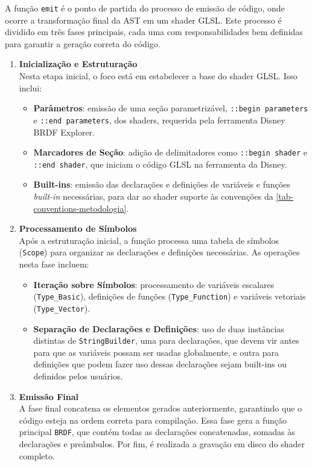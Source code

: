 A função \verb"emit" é o ponto de partida do processo de emissão de código, onde ocorre a transformação final da AST em um shader GLSL. Este processo é dividido em três fases principais, cada uma com responsabilidades bem definidas para garantir a geração correta do código.

\begin{enumerate}
    \item \textbf{Inicialização e Estruturação} \\
    Nesta etapa inicial, o foco está em estabelecer a base do shader GLSL. Isso inclui:
    \begin{itemize}
        \item \textbf{Parâmetros}: emissão de uma seção parametrizável, \verb"::begin parameters" e \verb"::end parameters", dos shaders, requerida pela ferramenta Disney BRDF Explorer.
        \item \textbf{Marcadores de Seção}: adição de delimitadores como \verb|::begin shader| e \verb|::end shader|, que iniciam o código GLSL na ferramenta da Disney.
        \item \textbf{Built-ins}: emissão das declarações e definições de variáveis e funções \textit{built-in} necessárias, para dar ao shader suporte às convenções da \autoref{tab-conventions-metodologia}.
    \end{itemize}

    \item \textbf{Processamento de Símbolos} \\
    Após a estruturação inicial, a função processa uma tabela de símbolos (\verb|Scope|) para organizar as declarações e definições necessárias. As operações nesta fase incluem:
    \begin{itemize}
        \item \textbf{Iteração sobre Símbolos}: processamento de variáveis escalares (\verb|Type_Basic|), definições de funções (\verb|Type_Function|) e variáveis vetoriais (\verb|Type_Vector|).
        \item \textbf{Separação de Declarações e Definições}: uso de duas instâncias distintas de \texttt{StringBuilder}, uma para declarações, que devem vir antes para que as variáveis possam ser usadas globalmente, e outra para definições que podem fazer uso dessas declarações sejam built-ins ou definidos pelos usuários.
    \end{itemize}

    \item \textbf{Emissão Final} \\
        A fase final concatena os elementos gerados anteriormente, garantindo que o código esteja na ordem correta para compilação. Essa fase gera a função principal \verb|BRDF|, que contém todas as declarações concatenadas, somadas às declarações e preâmbulos. Por fim, é realizada a gravação em disco do shader completo.
\end{enumerate}


